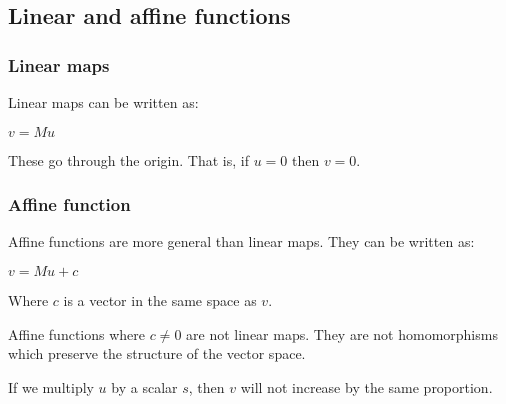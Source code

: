 
\subsection{Linear and affine functions}

\subsubsection{Linear maps}

Linear maps can be written as:

\(v=Mu\)

These go through the origin. That is, if \(u=0\) then \(v=0\).

\subsubsection{Affine function}

Affine functions are more general than linear maps. They can be written as:

\(v=Mu+c\)

Where \(c\) is a vector in the same space as \(v\).

Affine functions where \(c\ne 0\) are not linear maps. They are not homomorphisms which preserve the structure of the vector space.

If we multiply \(u\) by a scalar \(s\), then \(v\) will not increase by the same proportion. 

